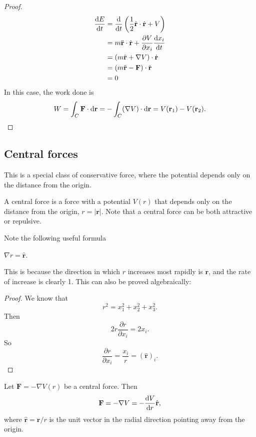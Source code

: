 \documentclass[a4paper]{article}
\begin{document}
\begin{proof}
  \begin{align*}
    \frac{\mathrm{d} E}{\mathrm{d} t} &= \frac{\mathrm{d}}{\mathrm{d} t}\left(\frac{1}{2}\dot{\mathbf{r}}\cdot \dot{\mathbf{r}} + V\right)\\
    &= m\ddot{\mathbf{r}}\cdot \dot{\mathbf{r}} + \frac{\partial V}{\partial x_i}\frac{\mathrm{d} x_i}{\mathrm{d} t}\\
    &= (m\ddot{\mathbf{r}} + \nabla V)\cdot \dot{\mathbf{r}}\\
    &= (m\ddot{\mathbf{r}} - \mathbf{F})\cdot \dot{\mathbf{r}}\\
    &= 0
  \end{align*}
  In this case, the work done is
  \[
    W = \int_C \mathbf{F}\cdot \mathrm{d} \mathbf{r} = -\int_C (\nabla V)\cdot \mathrm{d} \mathbf{r} = V(\mathbf{r}_1) - V(\mathbf{r}_2).
  \]
\end{proof}
\subsection{Central forces}
This is a special class of conservative force, where the potential depends only on the distance from the origin.
\begin{defi}
  A central force is a force with a potential $V(r)$ that depends only on the distance from the origin, $r = |\mathbf{r}|$. Note that a central force can be both attractive or repulsive.
\end{defi}

Note the following useful formula
\begin{prop}
  $\nabla r = \hat{\mathbf{r}}$. 
\end{prop}
This is because the direction in which $r$ increases most rapidly is $\mathbf{r}$, and the rate of increase is clearly 1. This can also be proved algebraically:

\begin{proof}
  We know that
  \[
    r^2 = x_1^2 + x_2^2 + x_3^2.
  \]
  Then
  \[
    2r\frac{\partial r}{\partial x_i} = 2x_i.
  \]
  So
  \[
    \frac{\partial r}{\partial x_i} = \frac{x_i}{r} = (\hat{\mathbf{r}})_i.
  \]
\end{proof}

\begin{prop}
  Let $\mathbf{F} = -\nabla V(r)$ be a central force. Then
  \[
    \mathbf{F} = -\nabla V = -\frac{\mathrm{d} V}{\mathrm{d} r} \hat{\mathbf{r}},
  \]
  where $\hat{\mathbf{r}} = \mathbf{r}/r$ is the unit vector in the radial direction pointing away from the origin.
\end{prop}
\end{document}
